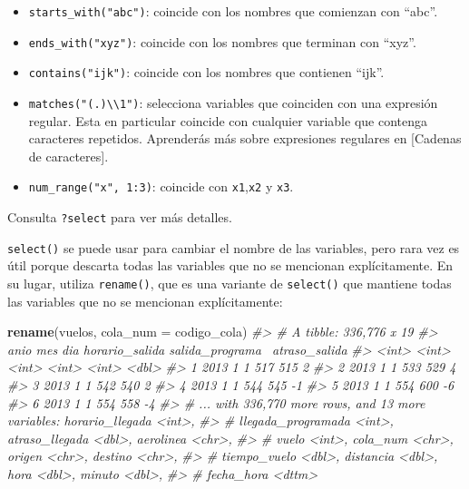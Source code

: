 \documentclass[11pt,oneside]{report}
\newenvironment{Shaded}{\begin{snugshade}}{\end{snugshade}}
\newcommand{\CommentTok}[1]{\textcolor[rgb]{0.56,0.35,0.01}{\textit{#1}}}
\newcommand{\DataTypeTok}[1]{\textcolor[rgb]{0.13,0.29,0.53}{#1}}
\newcommand{\KeywordTok}[1]{\textcolor[rgb]{0.13,0.29,0.53}{\textbf{#1}}}
\newcommand{\NormalTok}[1]{#1}
\begin{document}
\begin{itemize}
\item
  \texttt{starts\_with("abc")}: coincide con los nombres que comienzan
  con ``abc''.
\item
  \texttt{ends\_with("xyz")}: coincide con los nombres que terminan con
  ``xyz''.
\item
  \texttt{contains("ijk")}: coincide con los nombres que contienen
  ``ijk''.
\item
  \texttt{matches("(.)\textbackslash{}\textbackslash{}1")}: selecciona
  variables que coinciden con una expresión regular. Esta en particular
  coincide con cualquier variable que contenga caracteres repetidos.
  Aprenderás más sobre expresiones regulares en {[}Cadenas de
  caracteres{]}.
\item
  \texttt{num\_range("x",\ 1:3)}: coincide con \texttt{x1},\texttt{x2} y
  \texttt{x3}.
\end{itemize}

Consulta \texttt{?select} para ver más detalles.

\texttt{select()} se puede usar para cambiar el nombre de las variables,
pero rara vez es útil porque descarta todas las variables que no se
mencionan explícitamente. En su lugar, utiliza \texttt{rename()}, que es
una variante de \texttt{select()} que mantiene todas las variables que
no se mencionan explícitamente:

\begin{Shaded}
\begin{Highlighting}[]
\KeywordTok{rename}\NormalTok{(vuelos, }\DataTypeTok{cola_num =}\NormalTok{ codigo_cola)}
\CommentTok{#> # A tibble: 336,776 x 19}
\CommentTok{#>    anio   mes   dia horario_salida salida_programa~ atraso_salida}
\CommentTok{#>   <int> <int> <int>          <int>            <int>         <dbl>}
\CommentTok{#> 1  2013     1     1            517              515             2}
\CommentTok{#> 2  2013     1     1            533              529             4}
\CommentTok{#> 3  2013     1     1            542              540             2}
\CommentTok{#> 4  2013     1     1            544              545            -1}
\CommentTok{#> 5  2013     1     1            554              600            -6}
\CommentTok{#> 6  2013     1     1            554              558            -4}
\CommentTok{#> # ... with 336,770 more rows, and 13 more variables: horario_llegada <int>,}
\CommentTok{#> #   llegada_programada <int>, atraso_llegada <dbl>, aerolinea <chr>,}
\CommentTok{#> #   vuelo <int>, cola_num <chr>, origen <chr>, destino <chr>,}
\CommentTok{#> #   tiempo_vuelo <dbl>, distancia <dbl>, hora <dbl>, minuto <dbl>,}
\CommentTok{#> #   fecha_hora <dttm>}
\end{Highlighting}
\end{Shaded}
\end{document}
